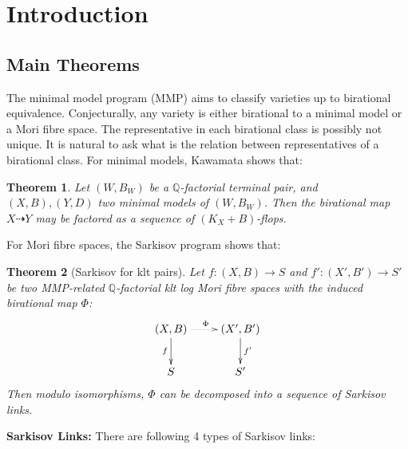 \documentclass[11pt]{amsart}
\numberwithin{equation}{section}
\newtheorem{thm}{Theorem}[subsection]
\theoremstyle{definition}
\theoremstyle{definition}
\theoremstyle{definition}
\begin{document}
\address{address}

\maketitle


\tableofcontents

\section{Introduction}\label{sec:Introduction}

\subsection{Main Theorems}
The minimal model program (MMP)  aims to classify varieties up to birational equivalence.
Conjecturally, any variety is either birational to a minimal model or a Mori fibre space. The representative in each birational class is possibly not unique. It is natural to ask what is the relation between representatives of a birational class. 
For minimal models, Kawamata shows that:
\begin{thm}
\cite[Theorem 1]{kawamataFlopsConnectMinimal2008} Let $(W,B_W)$ be a $\mathbb{Q}$-factorial terminal pair, and $(X,B),(Y,D)$  two minimal models of $(W,B_W)$. Then the birational map $X\dashrightarrow Y$ may be factored as a sequence of $(K_X+B)$-flops.
\end{thm}
For Mori fibre spaces, the Sarkisov program shows that:
\begin{thm}[Sarkisov for klt pairs]\label{thm: kltsp}
  Let $ f:(X, B)\to S$ and $f':(X', B')\to S' $ be two MMP-related $ \mathbb{Q} $-factorial klt log Mori fibre spaces with the induced  birational map $\Phi$:
  \[
    \xymatrix{
      (X,B)\ar[d]_f\ar@{.>}[r]^\Phi&(X',B')\ar[d]^{f'}\\
      S&S'}
  \]
  Then modulo isomorphisms, $ \Phi  $ can be decomposed into a sequence of Sarkisov links.
\end{thm}
\textbf{Sarkisov Links:}
There are following 4 types of Sarkisov links:
\end{document}
